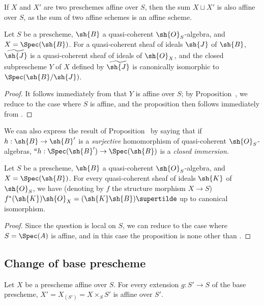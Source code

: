 \begin{remark}[1.4.9]
\label{II.1.4.9}
If $X$ and $X'$ are two preschemes affine over $S$, then the sum $X\sqcup X'$ is also affine over $S$, as the sum of two affine schemes is an affine scheme.
\end{remark}

\begin{proposition}[1.4.10]
\label{II.1.4.10}
Let $S$ be a prescheme, $\sh{B}$ a quasi-coherent $\sh{O}_S$-algebra, and $X=\Spec(\sh{B})$.
For a quasi-coherent sheaf of ideals $\sh{J}$ of $\sh{B}$, $\widetilde{\sh{J}}$ is a quasi-coherent sheaf of ideals of $\sh{O}_X$, and the closed subprescheme $Y$ of $X$ defined by $\widetilde{\sh{J}}$ is canonically isomorphic to $\Spec(\sh{B}/\sh{J})$.
\end{proposition}

\begin{proof}
It follows immediately from  that $Y$ is affine over $S$; by Proposition~, we reduce to the case where $S$ is affine, and the proposition then follows immediately from .
\end{proof}

We can also express the result of Proposition~ by saying that if $h:\sh{B}\to\sh{B}'$ is a \emph{surjective} homomorphism of quasi-coherent $\sh{O}_S$-algebras, ${}^a h:\Spec(\sh{B}')\to\Spec(\sh{B})$ is a \emph{closed immersion}.

\begin{proposition}[1.4.11]
\label{II.1.4.11}
Let $S$ be a prescheme, $\sh{B}$ a quasi-coherent $\sh{O}_S$-algebra, and $X=\Spec(\sh{B})$.
For every quasi-coherent sheaf of ideals $\sh{K}$ of $\sh{O}_S$, we have (denoting by $f$ the structure morphism $X\to S$) $f^*(\sh{K})\sh{O}_X=(\sh{K}\sh{B})\supertilde$ up to canonical isomorphism.
\end{proposition}

\begin{proof}
Since the question is local on $S$, we can reduce to the case where $S=\Spec(A)$ is affine, and in this case the proposition is none other than .
\end{proof}

\subsection{Change of base prescheme}
\label{subsection:II.1.5}

\begin{proposition}[1.5.1]
\label{II.1.5.1}
Let $X$ be a prescheme affine over $S$.
For every extension $g:S'\to S$ of the base prescheme, $X'=X_{(S')}=X\times_S S'$ is affine over $S'$.
\end{proposition}

